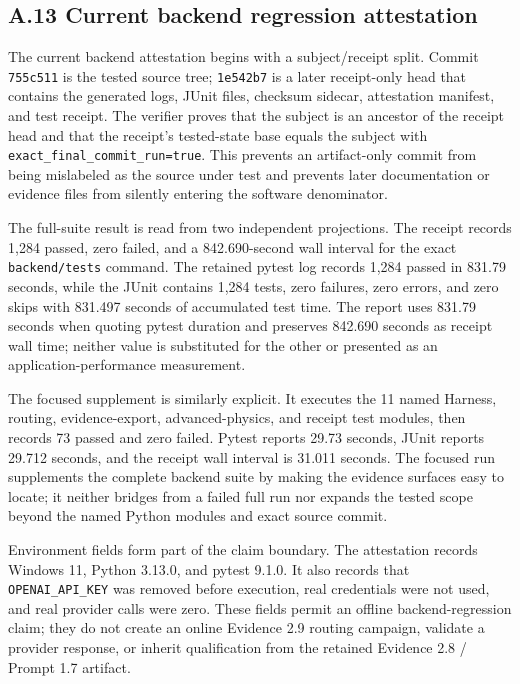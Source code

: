 \subsection{\texorpdfstring{\textbf{A.13 Current backend regression
attestation}}{A.13 Current backend regression attestation}}\label{a.13-current-backend-regression-attestation}

The current backend attestation begins with a subject/receipt split. Commit
\texttt{755c511} is the tested source tree; \texttt{1e542b7} is a later
receipt-only head that contains the generated logs, JUnit files, checksum
sidecar, attestation manifest, and test receipt. The verifier proves that the
subject is an ancestor of the receipt head and that the receipt's tested-state
base equals the subject with \texttt{exact\_final\_commit\_run=true}. This
prevents an artifact-only commit from being mislabeled as the source under
test and prevents later documentation or evidence files from silently entering
the software denominator.

The full-suite result is read from two independent projections. The receipt
records 1,284 passed, zero failed, and a 842.690-second wall interval for the
exact \texttt{backend/tests} command. The retained pytest log records
1,284 passed in 831.79 seconds, while the JUnit contains 1,284 tests, zero
failures, zero errors, and zero skips with 831.497 seconds of accumulated test
time. The report uses 831.79 seconds when quoting pytest duration and preserves
842.690 seconds as receipt wall time; neither value is substituted for the
other or presented as an application-performance measurement.

The focused supplement is similarly explicit. It executes the 11 named
Harness, routing, evidence-export, advanced-physics, and receipt test modules,
then records 73 passed and zero failed. Pytest reports 29.73 seconds, JUnit
reports 29.712 seconds, and the receipt wall interval is 31.011 seconds. The
focused run supplements the complete backend suite by making the evidence
surfaces easy to locate; it neither bridges from a failed full run nor expands
the tested scope beyond the named Python modules and exact source commit.

Environment fields form part of the claim boundary. The attestation records
Windows 11, Python 3.13.0, and pytest 9.1.0. It also records that
\texttt{OPENAI\_API\_KEY} was removed before execution, real credentials were
not used, and real provider calls were zero. These fields permit an offline
backend-regression claim; they do not create an online Evidence 2.9 routing
campaign, validate a provider response, or inherit qualification from the
retained Evidence 2.8 / Prompt 1.7 artifact.

